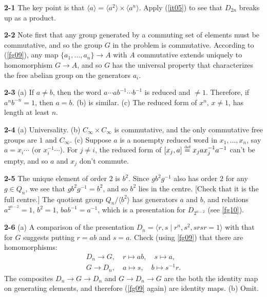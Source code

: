 \documentclass[a4paper,11pt,final]{memoir}%
\theoremstyle{nonumberplain}
\begin{document}
\bigskip\noindent\textbf{2-1}
The key point is that $\langle a\rangle=\langle a^{2}\rangle\times\langle
a^{n}\rangle$. Apply (\ref{it05}) to see that $D_{2n}$ breaks up as a product.

\bigskip\noindent\textbf{2-2}
Note first that any group generated by a commuting set of elements must be
commutative, and so the group $G$ in the problem is commutative. According to
(\ref{fg09}), any map $\{a_{1},\ldots,a_{n}\}\rightarrow A$ with $A$
commutative extends uniquely to homomorphism $G\rightarrow A$, and so $G$ has
the universal property that characterizes the free abelian group on the
generators $a_{i}$.

\bigskip\noindent\textbf{2-3}
(a) If $a\neq b$, then the word $a\cdots ab^{-1}\cdots b^{-1}$ is reduced and
$\neq1$. Therefore, if $a^{n}b^{-n}=1$, then $a=b$. (b) is similar. (c) The
reduced form of $x^{n}$, $x\neq1$, has length at least $n$.

\bigskip\noindent\textbf{2-4}
(a) Universality. (b) $C_{\infty}\times C_{\infty}$ is commutative, and the
only commutative free groups are $1$ and $C_{\infty}$. (c) Suppose $a$ is a
nonempty reduced word in $x_{1},\ldots,x_{n}$, say $a=x_{i}\cdots$ (or
$x_{i}^{-1}\cdots$). For $j\neq i$, the reduced form of $[x_{j},a]\overset
{\text{{\tiny def}}}{=}x_{j}ax_{j}^{-1}a^{-1}$ can't be empty, and so $a$ and
$x_{j}$ don't commute.

\bigskip\noindent\textbf{2-5}
The unique element of order $2$ is $b^{2}$. Since $gb^{2}g^{-1}$ also has
order $2$ for any $g\in Q_{n}$, we see that $gb^{2}g^{-1}=b^{2}$, and so
$b^{2}$ lies in the centre. [Check that it is the full centre.] The quotient
group $Q_{n}/\langle b^{2}\rangle$ has generators $a$ and $b$, and relations
$a^{2^{n-2}}=1$, $b^{2}=1$, $bab^{-1}=a^{-1}$, which is a presentation for
$D_{2^{n-2}}$ (see \ref{fg10}).

\bigskip\noindent\textbf{2-6}
(a) A comparison of the presentation $D_{n}=\langle r,s\mid r^{n}%
,s^{2},srsr=1\rangle$ with that for $G$ suggests putting $r=ab$ and $s=a$.
Check (using \ref{fg09}) that there are homomorphisms:
\begin{align*}
D_{n}\rightarrow G,\quad r\mapsto ab,\quad s\mapsto a,\\
 G\rightarrow
D_{n},\quad a\mapsto s,\quad b\mapsto s^{-1}r\text{.}%
\end{align*}
The composites $D_{n}\rightarrow G\rightarrow D_{n}$ and $G\rightarrow
D_{n}\rightarrow G$ are the both the identity map on generating elements, and
therefore (\ref{fg09} again) are identity maps. (b) Omit.
\end{document}
